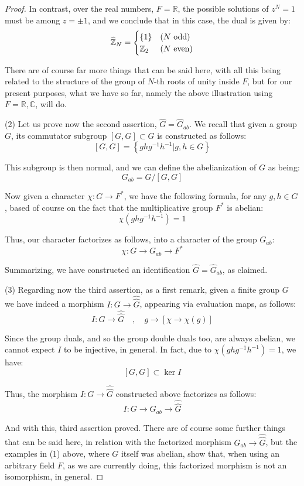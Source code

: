 \documentclass[12pt]{amsbook}
\begin{document}
\begin{proof}
In contrast, over the real numbers, $F=\mathbb R$, the possible solutions of $z^N=1$ must be among $z=\pm1$, and we conclude that in this case, the dual is given by:
$$\widehat{\mathbb Z}_N=\begin{cases}
\{1\}&(N\ {\rm odd})\\
\mathbb Z_2&(N\ {\rm even})
\end{cases}$$

There are of course far more things that can be said here, with all this being related to the structure of the group of $N$-th roots of unity inside $F$, but for our present purposes, what we have so far, namely the above illustration using $F=\mathbb R,\mathbb C$, will do.

\medskip

(2) Let us prove now the second assertion, $\widehat{G}=\widehat{G}_{ab}$. We recall that given a group $G$, its commutator subgroup $[G,G]\subset G$ is constructed as follows:
$$[G,G]=\left\{ghg^{-1}h^{-1}\Big|g,h\in G\right\}$$

This subgroup is then normal, and we can define the abelianization of $G$ as being:
$$G_{ab}=G/[G,G]$$

Now given a character $\chi:G\to F^*$, we have the following formula, for any $g,h\in G$, based of course on the fact that the multiplicative group $F^*$ is abelian:
$$\chi(ghg^{-1}h^{-1})=1$$

Thus, our character factorizes as follows, into a character of the group $G_{ab}$:
$$\chi:G\to G_{ab}\to F^*$$

Summarizing, we have constructed an identification $\widehat{G}=\widehat{G}_{ab}$, as claimed.

\medskip

(3) Regarding now the third assertion, as a first remark, given a finite group $G$ we have indeed a morphism $I:G\to\widehat{\widehat{G}}$, appearing via evaluation maps, as follows:
$$I:G\to\widehat{\widehat{G}}\quad,\quad g\to[\chi\to\chi(g)]$$

Since the group duals, and so the group double duals too, are always abelian, we cannot expect $I$ to be injective, in general. In fact, due to $\chi(ghg^{-1}h^{-1})=1$, we have:
$$[G,G]\subset\ker I$$

Thus, the morphism $I:G\to\widehat{\widehat{G}}$ constructed above factorizes as follows:
$$I:G\to G_{ab}\to \widehat{\widehat{G}}$$

And with this, third assertion proved. There are of course some further things that can be said here, in relation with the factorized morphism $G_{ab}\to \widehat{\widehat{G}}$, but the examples in (1) above, where $G$ itself was abelian, show that, when using an arbitrary field $F$, as we are currently doing, this factorized morphism is not an isomorphism, in general.


\end{proof}
\end{document}

